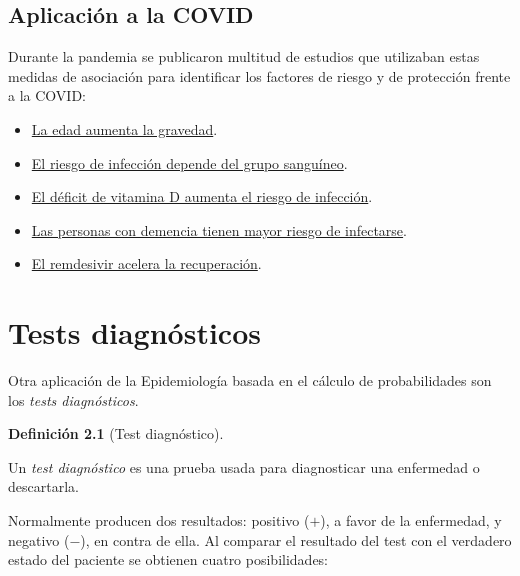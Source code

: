 \documentclass[
  spanish,
  a4paper,
]{scrreport}
\providecommand{\tightlist}{%
  \setlength{\itemsep}{0pt}\setlength{\parskip}{0pt}}
\theoremstyle{definition}
\newtheorem{definition}{Definición}[chapter]
\theoremstyle{definition}
\theoremstyle{remark}
\begin{document}
\section{Aplicación a la COVID}\label{aplicaciuxf3n-a-la-covid}

Durante la pandemia se publicaron multitud de estudios que utilizaban
estas medidas de asociación para identificar los factores de riesgo y de
protección frente a la COVID:

\begin{itemize}
\tightlist
\item
  \href{https://www.npr.org/sections/coronavirus-live-updates/2020/03/22/819846180/study-calculates-just-how-much-age-medical-conditions-raise-odds-of-severe-covid}{La
  edad aumenta la gravedad}.
\item
  \href{https://www.aarp.org/espanol/salud/enfermedades-y-tratamientos/info-2020/tipo-de-sangre-y-riesgo-de-covid.html}{El
  riesgo de infección depende del grupo sanguíneo}.
\item
  \href{https://medicalxpress.com/news/2021-01-vitamin-d-deficiency-covid-.html}{El
  déficit de vitamina D aumenta el riesgo de infección}.
\item
  \href{https://www.sciencedaily.com/releases/2021/02/210209083524.htm}{Las
  personas con demencia tienen mayor riesgo de infectarse}.
\item
  \href{https://www.nejm.org/doi/full/10.1056/NEJMoa2007764}{El
  remdesivir acelera la recuperación}.
\end{itemize}


\chapter{Tests diagnósticos}\label{sec-tests-diagnosticos}

Otra aplicación de la Epidemiología basada en el cálculo de
probabilidades son los \emph{tests diagnósticos}.

\begin{definition}[Test
diagnóstico]\protect\hypertarget{def-test-diagnostico}{}\label{def-test-diagnostico}

Un \emph{test diagnóstico} es una prueba usada para diagnosticar una
enfermedad o descartarla.

\end{definition}

Normalmente producen dos resultados: positivo (\(+\)), a favor de la
enfermedad, y negativo (\(-\)), en contra de ella. Al comparar el
resultado del test con el verdadero estado del paciente se obtienen
cuatro posibilidades:
\end{document}
